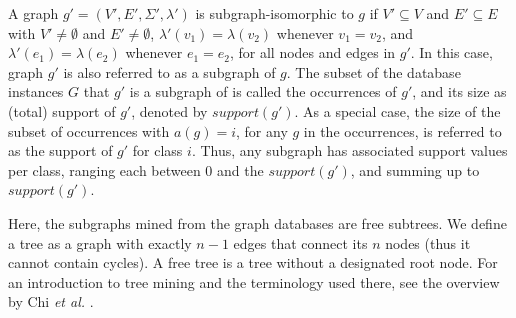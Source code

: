 \documentclass{sig-alternate}
\begin{document}
A graph $g'=(V',E',\Sigma',\lambda')$ is subgraph-isomorphic to $g$ if $V'
\subseteq V$ and $E' \subseteq E$ with $V' \ne \emptyset$ and $E' \ne
\emptyset$, $\lambda'(v_1)=\lambda(v_2)$ whenever $v_1=v_2$, and
$\lambda'(e_1)=\lambda(e_2)$ whenever $e_1=e_2$, for all nodes and edges in
$g'$. In this case, graph $g'$ is also referred to as a subgraph of $g$. The subset of 
the database instances $G$ that $g'$ is a subgraph of is called the occurrences of $g'$, 
and its size as (total) support of
$g'$, denoted by $support(g')$. As a special case, the size of the subset of occurrences with $a(g)=i$,
for any $g$ in the occurrences, is referred to as the support of $g'$ for class
$i$. Thus, any subgraph has associated support values per class, ranging each
between 0 and the $support(g')$, and summing up to $support(g')$.

Here, the subgraphs mined from the graph databases are free subtrees. We define a tree
as a graph with exactly $n-1$ edges that connect its $n$ nodes (thus it cannot contain cycles). A free tree is
a tree without a designated root node. For an introduction to tree mining and
the terminology used there, see the overview by Chi \emph{et al.}
\cite{CMNK01Frequent}.
\end{document}
